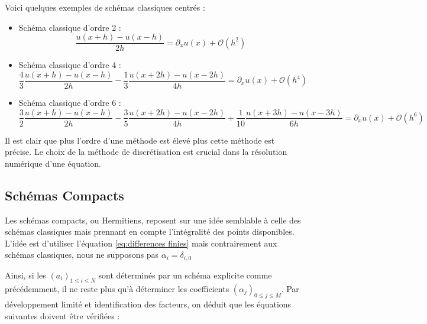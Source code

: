 \begin{exemple}
  Voici quelques exemples de schémas classiques centrés :

  \begin{itemize}
  \item Schéma classique d'ordre 2 :
    \begin{equation}
      \label{eq:classique ordre 2}
      \dfrac{u(x+h)-u(x-h)}{2h} = \partial_x u(x) + \mathcal{O} \left( h^2 \right)
    \end{equation}

  \item Schéma classique d'ordre 4 :
    \begin{equation}
      \label{eq:classique ordre 4}
      \dfrac{4}{3} \dfrac{u(x+h)-u(x-h)}{2h} - \dfrac{1}{3} \dfrac{u(x+2h)-u(x-2h)}{4h}  = \partial_x u(x) + \mathcal{O} \left( h^4 \right)
    \end{equation}

    \item Schéma classique d'ordre 6 :
    \begin{equation}
      \label{eq:classique ordre 6}
      \dfrac{3}{2} \dfrac{u(x+h)-u(x-h)}{2h} - \dfrac{3}{5} \dfrac{u(x+2h)-u(x-2h)}{4h} + \dfrac{1}{10} \dfrac{u(x+3h)-u(x-3h)}{6h} = \partial_x u(x) + \mathcal{O} \left( h^6 \right)
    \end{equation}
    
  \end{itemize}
\end{exemple}

Il est clair que plus l'ordre d'une méthode est élevé plus cette méthode est précise. Le choix de la méthode de discrétisation est crucial dans la résolution numérique d'une équation.

\subsection{Schémas Compacts }

Les schémas compacts, ou Hermitiens, reposent sur une idée semblable à celle des schémas classiques mais prennant en compte l'intégralité des points disponibles. L'idée est d'utiliser l'équation \eqref{eq:differences finies} mais contrairement aux schémas classiques, nous ne supposons pas $\alpha_i = \delta_{i,0}$

Ainsi, si les $(a_i)_{1 \leq i \leq N}$ sont déterminés par un schéma explicite comme précédemment, il ne reste plus qu'à déterminer les coefficients $(\alpha_j)_{0 \leq j \leq M}$. Par développement limité et identification des facteurs, on déduit que les équations suivantes doivent être vérifiées :

